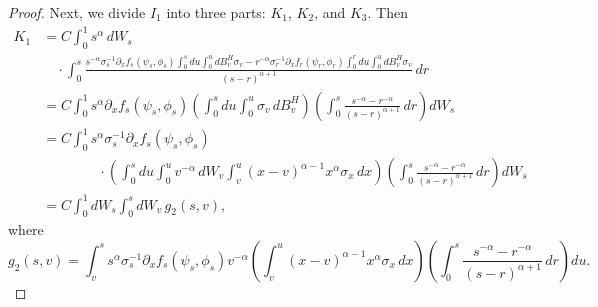 \documentclass[10pt,a4paper]{amsart}
\begin{document}
\begin{proof}
Next, we divide \( I_1 \) into three parts: \( K_1 \), \( K_2 \), and \( K_3 \). Then
\begin{align*}
    K_1 &= C \int_0^1 s^\alpha \, dW_s \\
    &\quad \cdot \int_0^s \frac{s^{-\alpha} \sigma_s^{-1} \partial_x f_s(\psi_s, \phi_s) \int_0^s du \int_0^u dB^H_v \sigma_v - r^{-\alpha} \sigma_r^{-1} \partial_x f_r(\psi_r, \phi_r) \int_0^r du \int_0^u dB^H_v \sigma_v}{(s - r)^{\alpha + 1}} \, dr \\
    &= C \int_0^1 s^\alpha \partial_x f_s(\psi_s, \phi_s) \left( \int_0^s du \int_0^u \sigma_v \, dB^H_v \right) \left( \int_0^s \frac{s^{-\alpha} - r^{-\alpha}}{(s - r)^{\alpha + 1}} \, dr \right) dW_s \\
    &= C \int_0^1 s^\alpha \sigma_s^{-1} \partial_x f_s(\psi_s, \phi_s) \\
    &\qquad\qquad \cdot \left( \int_0^s du \int_0^u v^{-\alpha} \, dW_v \int_v^u (x-v)^{\alpha-1} x^\alpha \sigma_x \, dx \right) \left( \int_0^s \frac{s^{-\alpha} - r^{-\alpha}}{(s - r)^{\alpha + 1}} \, dr \right) dW_s \\
    &= C \int_0^1 dW_s \int_0^s dW_v \, g_2(s,v),
\end{align*}
where
\[
    g_2(s,v) = \int_v^s s^\alpha \sigma_s^{-1} \partial_x f_s(\psi_s, \phi_s) v^{-\alpha} \left( \int_v^u (x-v)^{\alpha-1} x^\alpha \sigma_x \, dx \right) \left( \int_0^s \frac{s^{-\alpha} - r^{-\alpha}}{(s - r)^{\alpha + 1}} \, dr \right) du.
\]


\end{proof}
\end{document}
